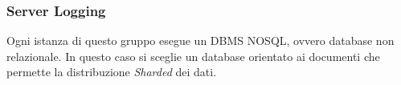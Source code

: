 \subsubsection{Server Logging}
Ogni istanza di questo gruppo esegue un DBMS NOSQL, ovvero database non relazionale.
In questo caso si sceglie un database orientato ai documenti che permette la distribuzione \emph{Sharded} dei dati.
